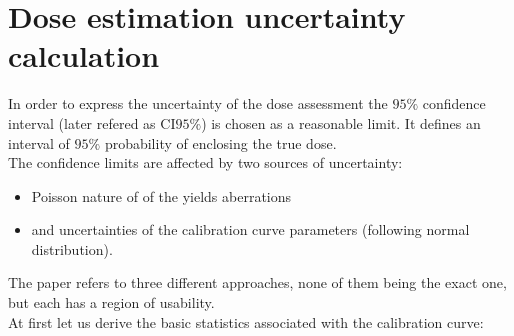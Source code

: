 \documentclass[a4paper,11pt]{article}
\begin{document}
\section{Dose estimation uncertainty calculation}
In order to express the uncertainty of the dose assessment the $95\%$ confidence interval (later refered as CI$95\%$) is chosen as a reasonable limit. It defines an interval of $95\%$ probability of enclosing the true dose.\\
The confidence limits are affected by two sources of uncertainty:
\begin{itemize}
\item Poisson nature of of the yields aberrations
\item and uncertainties of the calibration curve parameters (following normal distribution).
\end{itemize}
The paper refers to three different approaches, none of them being the exact one, but each has a region of usability.\\
At first let us derive the basic statistics associated with the calibration curve:
\end{document}
